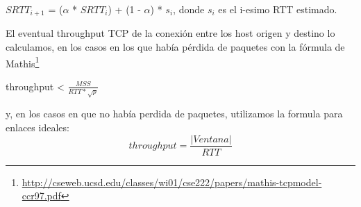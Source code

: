 \begin{center}
  $SRTT_{i+1}$ = ($\alpha$ * $SRTT_i$) + (1 - $\alpha$) * $s_i$, donde $s_i$ es el i-esimo RTT estimado.
\end{center}

 El eventual throughput TCP de la conexión entre los host origen y destino lo calculamos, en los casos en los que había pérdida de paquetes con la fórmula de Mathis\footnote{\url{http://cseweb.ucsd.edu/classes/wi01/cse222/papers/mathis-tcpmodel-ccr97.pdf}}
\begin{center}
	throughput < $\frac{MSS}{RTT * \sqrt{p}}$
\end{center}

y, en los casos en que no había perdida de paquetes, utilizamos la formula para enlaces ideales:
\begin{displaymath}
  throughput = \frac{|Ventana|}{RTT}
\end{displaymath}
